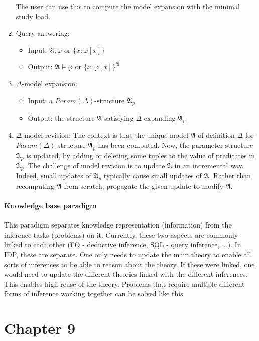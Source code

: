 \documentclass[10pt,a4paper]{article}
\theoremstyle{definition}
\begin{document}
\begin{enumerate}
	The user can use this to compute the model expansion with the minimal study load.
	\item Query answering: 
		\begin{itemize}
			\item Input: $\mathfrak{A}, \varphi$ or $\{x : \varphi[x]\}$
			\item Output: $\mathfrak{A} \models \varphi$ or $\{x : \varphi[x]\}^\mathfrak{A}$
		\end{itemize}			
	
	\item $\Delta$-model expansion: 
		\begin{itemize}
			\item Input: a $Param(\Delta)\text{-structure } \mathfrak{A}_p$
			\item Output: the structure $\mathfrak{A}$ satisfying $\Delta$ expanding $\mathfrak{A}_p$
		\end{itemize}
	\item $\Delta$-model revision: The context is that the unique model $\mathfrak{A}$ of definition $\Delta$ for $Param(\Delta)$-structure $\mathfrak{A}_p$ has been computed. Now, the parameter structure $\mathfrak{A}_p$ is updated, by adding or deleting some tuples to the value of predicates in $\mathfrak{A}_p$. The challenge of model revision is to update $\mathfrak{A}$ in an incremental way. Indeed, small updates of $\mathfrak{A}_p$ typically cause small updates of $\mathfrak{A}$. Rather than recomputing $\mathfrak{A}$ from scratch, propagate the given update to modify $\mathfrak{A}$.
\end{enumerate}

\paragraph{Knowledge base paradigm}
This paradigm separates knowledge representation (information) from the inference tasks (problems) on it. Currently, these two aspects are commonly linked to each other (FO - deductive inference, SQL - query inference, ...). In IDP, these are separate. One only needs to update the  main theory to enable all sorts of inferences to be able to reason about the theory. If these were linked, one would need to update the different theories linked with the different inferences. This enables high reuse of the theory. Problems that require multiple different forms of inference working together can be solved like this.


\section{Chapter 9}
\end{document}
